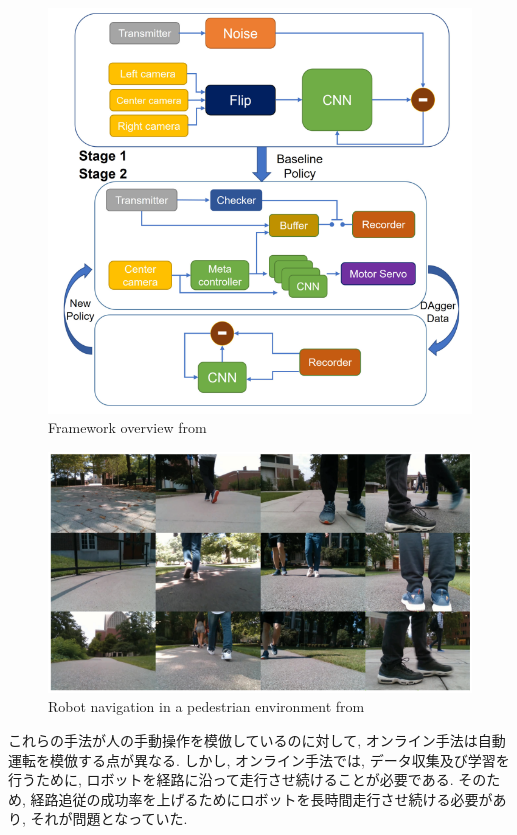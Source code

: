 \begin{figure}[h]
     \centering
     \includegraphics[keepaspectratio, scale=0.4]
     {images/jing-bi.png}
     \caption{Framework overview from \cite{bojaski}}
     \label{Fig:jing-bi}
     \end{figure}

\begin{figure}[h]
     \centering
     \includegraphics[keepaspectratio, scale=0.4]
     {images/pedestrian.png}
     \caption{Robot navigation in a pedestrian environment from \cite{bojaski}}
     \label{Fig:pedestrian}
     \end{figure}

\newpage
これらの手法が人の手動操作を模倣しているのに対して, オンライン手法は自動運転を模倣する点が異なる. しかし, オンライン手法では, データ収集及び学習を行うために, ロボットを経路に沿って走行させ続けることが必要である. そのため, 経路追従の成功率を上げるためにロボットを長時間走行させ続ける必要があり, それが問題となっていた. 

